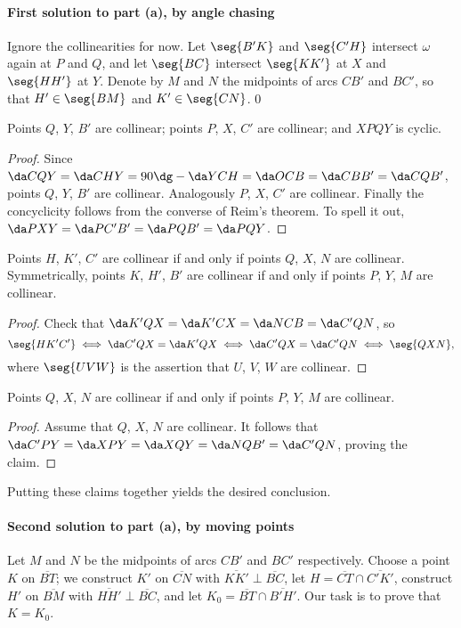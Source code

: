 \paragraph{First solution to part (a), by angle chasing}     Ignore the collinearities for now. Let $\seg{B'K}$ and $\seg{C'H}$ intersect $\omega$ again at $P$ and $Q$, and let $\seg{BC}$ intersect $\seg{KK'}$ at $X$ and $\seg{HH'}$ at $Y$. Denote by $M$ and $N$ the midpoints of arcs $CB'$ and $BC'$, so that $H'\in\seg{BM}$ and $K'\in\seg{CN}$.
\setcounter{claim}0
\begin{claim}
    Points $Q$, $Y$, $B'$ are collinear; points $P$, $X$, $C'$ are collinear; and $XPQY$ is cyclic.
\end{claim}
\begin{proof}
    Since $\da CQY=\da CHY=90\dg-\da YCH=\da OCB=\da CBB'=\da CQB'$, points $Q$, $Y$, $B'$ are collinear. Analogously $P$, $X$, $C'$ are collinear. Finally the concyclicity follows from the converse of Reim's theorem. To spell it out, $\da PXY=\da PC'B'=\da PQB'=\da PQY$.
\end{proof}
\begin{claim}
    Points $H$, $K'$, $C'$ are collinear if and only if points $Q$, $X$, $N$ are collinear. Symmetrically, points $K$, $H'$, $B'$ are collinear if and only if points $P$, $Y$, $M$ are collinear.
\end{claim}
\begin{proof}
    Check that $\da K'QX=\da K'CX=\da NCB=\da C'QN$, so \[\seg{HK'C'}\iff\da C'QX=\da K'QX\iff\da C'QX=\da C'QN\iff\seg{QXN},\]
    where $\seg{UVW}$ is the assertion that $U$, $V$, $W$ are collinear.
\end{proof}
\begin{claim}
    Points $Q$, $X$, $N$ are collinear if and only if points $P$, $Y$, $M$ are collinear.
\end{claim}
\begin{proof}
    Assume that $Q$, $X$, $N$ are collinear. It follows that $\da C'PY=\da XPY=\da XQY=\da NQB'=\da C'QN$, proving the claim.
\end{proof}

Putting these claims together yields the desired conclusion.

\paragraph{Second solution to part (a), by moving points}     Let $M$ and $N$ be the midpoints of arcs $CB'$ and $BC'$ respectively. Choose a point $K$ on $\overline{BT}$; we construct $K'$ on $\overline{CN}$ with $\overline{KK'}\perp\overline{BC}$, let $H=\overline{CT}\cap\overline{C'K'}$, construct $H'$ on $\overline{BM}$ with $\overline{HH'}\perp\overline{BC}$, and let $K_0=\overline{BT}\cap\overline{B'H'}$. Our task is to prove that $K=K_0$.

